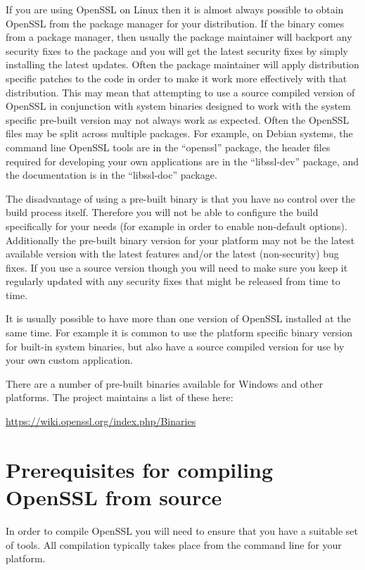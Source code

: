 If you are using OpenSSL on Linux then it is almost always possible to obtain
OpenSSL from the package manager for your distribution.  If the binary comes
from a package manager, then usually the package maintainer will backport any
security fixes to the package and you will get the latest security fixes by
simply installing the latest updates. Often the package maintainer will apply
distribution specific patches to the code in order to make it work more
effectively with that distribution. This may mean that attempting to use a
source compiled version of OpenSSL in conjunction with system binaries designed
to work with the system specific pre-built version may not always work as
expected. Often the OpenSSL files may be split across multiple packages. For
example, on Debian systems, the command line OpenSSL tools are in the
``openssl'' package, the header files required for developing your own
applications are in the ``libssl-dev'' package, and the documentation is in the
``libssl-doc'' package.

The disadvantage of using a pre-built binary is that you have no control over
the build process itself. Therefore you will not be able to configure the build
specifically for your needs (for example in order to enable non-default options).
Additionally the pre-built binary version for your platform may not be the
latest available version with the latest features and/or the latest
(non-security) bug fixes. If you use a source version though you will need to
make sure you keep it regularly updated with any security fixes that might be
released from time to time.

It is usually possible to have more than one version of OpenSSL installed at the
same time. For example it is common to use the platform specific binary version
for built-in system binaries, but also have a source compiled version for use by
your own custom application.

There are a number of pre-built binaries available for Windows and other
platforms. The project maintains a list of these here:

\url{https://wiki.openssl.org/index.php/Binaries}

\section{Prerequisites for compiling OpenSSL from source} \label{sec:getting-prereq}

In order to compile OpenSSL you will need to ensure that you have a suitable set of
tools. All compilation typically takes place from the command line for your platform.

